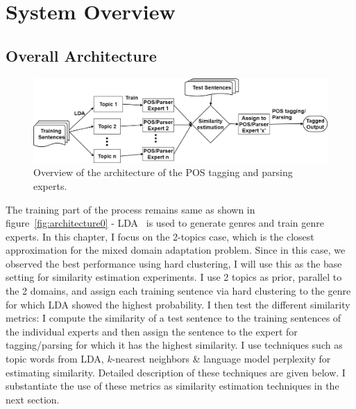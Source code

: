 \section{ System Overview}\label{problemstat}

\subsection{Overall Architecture}
\begin{figure}[t]
    \centering
    \includegraphics[width=\textwidth]{figures/approach-new.jpg}
 \caption{Overview of the architecture of the POS tagging and parsing experts.}\label{fig:architecture}   
 \end{figure}


The training part of the process remains same as shown in figure~\ref{fig:architecture0} - LDA~\citep{Blei:2012:PTM:2133806.2133826,Blei:2003:LDA:944919.944937} is used to generate genres and train genre experts. In this chapter, I focus on the 2-topics case, which is the closest approximation for the mixed domain adaptation problem. Since in this case, we observed the best performance using hard clustering, I will use this as the base setting for similarity estimation experiments. 
I use 2 topics as prior, parallel to the 2 domains, and assign each training sentence via hard clustering to the genre for which LDA showed the highest probability.%
I then test the different similarity metrics: I compute the similarity of a test sentence to the training sentences of the individual experts and then assign the sentence to the expert for tagging/parsing for which it has the highest similarity. I use techniques such as topic words from LDA, $k$-nearest neighbors \& language model perplexity for estimating similarity. Detailed description of these techniques are given below. I substantiate the use of these metrics as similarity estimation techniques in the next section.

